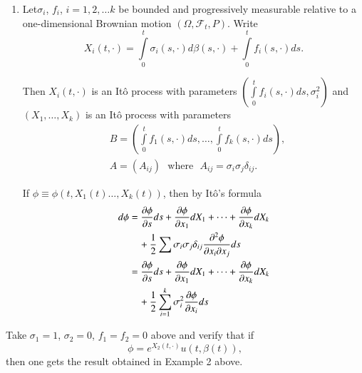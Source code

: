 \begin{examples*}
\begin{enumerate}
\item Let\pageoriginale $\sigma_{i}$, $f_{i}$, $i=1,2,\ldots k$ be
  bounded and progressively measurable relative to a one-dimensional
  Brownian motion $(\Omega,\mathscr{F}_{t},P)$. Write
$$
X_{i}(t,\cdot)=\int\limits^{t}_{0}\sigma_{i}(s,\cdot)d\beta(s,\cdot)+\int\limits^{t}_{0}f_{i}(s,\cdot)ds.
$$

Then $X_{i}(t,\cdot)$ is an It\^o process with parameters
$(\int\limits^{t}_{0}f_{i}(s,\cdot)ds,\sigma^{2}_{i})$ and
$(X_{1},\ldots,X_{k})$ is an It\^o process with parameters
\begin{align*}
& B=
  \left(\int\limits^{t}_{0}f_{1}(s,\cdot)ds,\ldots,\int\limits^{t}_{0}f_{k}(s,\cdot)ds\right),\\
& A=(A_{ij})\text{~ where~ } A_{ij}=\sigma_{i}\sigma_{j}\delta_{ij}.
\end{align*}

If $\phi\equiv \phi(t,X_{1}(t)\ldots,X_{k}(t))$, then by It\^o's
formula
\begin{align*}
d\phi &= \frac{\partial \phi}{\partial s}ds+\frac{\partial \phi}{\partial
  x_{1}}dX_{1}+\cdots+\frac{\partial \phi}{\partial x_{k}}dX_{k}\\
&\quad +\frac{1}{2}\sum
\sigma_{i}\sigma_{j}\delta_{ij}\frac{\partial^{2}\phi}{\partial x_{i}\partial x_{j}}ds\\
&= \frac{\partial \phi}{\partial s}ds+\frac{\partial \phi}{\partial
  x_{1}}dX_{1}+\cdots+\frac{\partial \phi}{\partial x_{k}}dX_{k}\\
&\quad +\frac{1}{2}\sum^{k}_{i=1}\sigma^{2}_{i}\frac{\partial \phi}{\partial x_{i}}ds
\end{align*}
\end{enumerate}
\end{examples*}

\begin{exer*}
Take $\sigma_{1}=1$, $\sigma_{2}=0$, $f_{1}=f_{2}=0$ above and verify
that if 
$$
\phi=e^{X_{2}(t,\cdot)}u(t,\beta(t)),
$$
then one gets the result obtained in Example 2 above.
\end{exer*}

